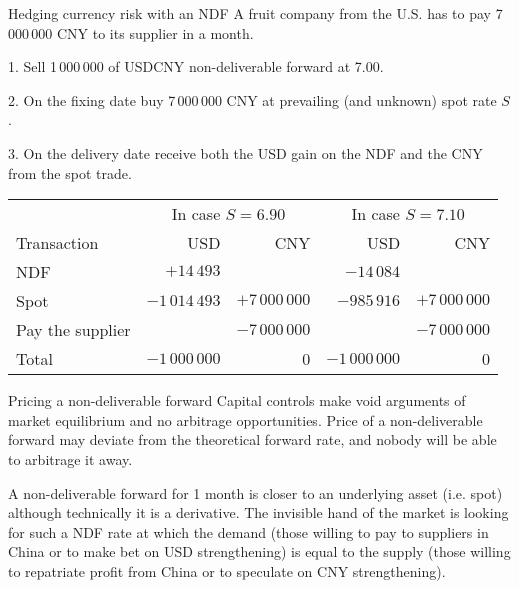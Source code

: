 \documentclass{beamer}
\begin{document}
\begin{frame}{Hedging currency risk with an NDF}
\justify
A fruit company from the U.S. has to pay 7\,000\,000 CNY to its supplier in a month.

1. Sell 1\,000\,000 of USDCNY non-deliverable forward at 7.00.

2. On the fixing date buy 7\,000\,000 CNY at prevailing (and unknown) spot rate  $S$.

3. On the delivery date receive both the USD gain on the NDF and the CNY from the spot trade.

\justify
\centering
\small
\begin{tabular}{l|r|r|r|r}
& \multicolumn{2}{c|}{In case $S=6.90$} & \multicolumn{2}{c}{In case $S=7.10$} \\ \cline{2-5}
Transaction & USD & CNY & USD & CNY \\ \hline
NDF & $+14\,493$ & & $-14\,084$ & \\
Spot & $-1\,014\,493$ & $+7\,000\,000$ & $-985\,916$ & $+7\,000\,000$ \\
Pay the supplier & & $-7\,000\,000$ & & $-7\,000\,000$ \\ \hline
Total & $-1\,000\,000$ & 0 & $-1\,000\,000$ & 0
\end{tabular}
\end{frame}



\begin{frame}{Pricing a non-deliverable forward}
\justify
Capital controls make void arguments of market equilibrium and no arbitrage opportunities. Price of a non-deliverable forward may deviate from the theoretical forward rate, and nobody will be able to arbitrage it away.

\justify
A non-deliverable forward for 1 month is closer to an underlying asset (i.e. spot) although technically it is a derivative. The invisible hand of the market is looking for such a NDF rate at which the demand (those willing to pay to suppliers in China or to make bet on USD strengthening) is equal to the supply (those willing to repatriate profit from China or to speculate on CNY strengthening).
\end{frame}
\end{document}

